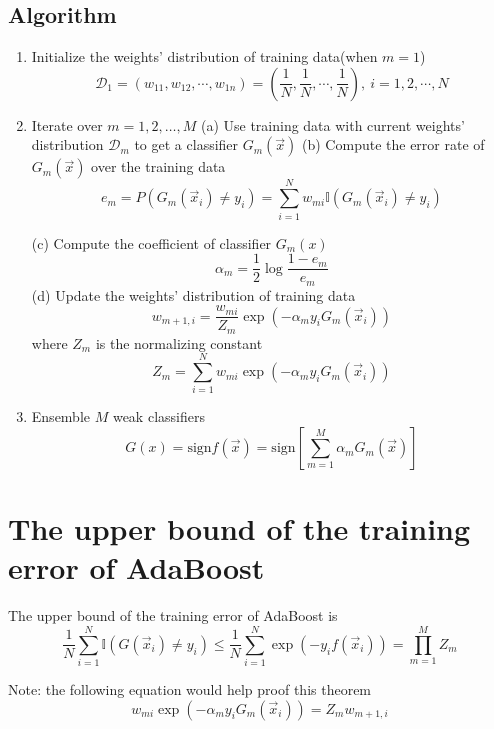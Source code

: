 \subsection{Algorithm}

\begin{enumerate}
\item Initialize the weights' distribution of training data(when $m=1$)
\begin{equation}\nonumber
\mathcal{D}_1=(w_{11},w_{12},\cdots,w_{1n})=(\frac{1}{N},\frac{1}{N},\cdots,\frac{1}{N}),\ i=1,2,\cdots,N
\end{equation}
\item Iterate over $m=1,2,\dotsc,M$
\subitem (a) Use training data with current weights' distribution $\mathcal{D}_m$ to get a classifier $G_m(\vec{x})$
\subitem (b) Compute the error rate of $G_m(\vec{x})$ over the training data \\
\begin{equation}
e_m=P(G_m(\vec{x}_i)\neq y_i)=\sum_{i=1}^N {w_{mi}\mathbb{I}(G_m(\vec{x}_i) \neq y_i)}
\end{equation}

\subitem (c) Compute the coefficient of classifier $G_m(x)$
\begin{equation}
\alpha_m = \frac{1}{2}\log{\frac{1-e_m}{e_m}}
\end{equation}
\subitem (d) Update the weights' distribution of training data
\begin{equation}
w_{m+1,i}=\frac{w_{mi}}{Z_m}\exp(-\alpha_m y_i G_m(\vec{x}_i))
\end{equation}
where $Z_m$ is the normalizing constant
\begin{equation}
Z_m=\sum_{i=1}^N w_{mi}\exp(-\alpha_m y_i G_m(\vec{x}_i))
\end{equation}

\item Ensemble $M$ weak classifiers
\begin{equation}
G(x)=\text{sign}f(\vec{x})=\text{sign}\left[\sum_{m=1}^M \alpha_m G_m(\vec{x})\right]
\end{equation}
\end{enumerate} 

\section{The upper bound of the training error of AdaBoost}
\begin{theorem}
The upper bound of the training error of AdaBoost is 
\begin{equation}
\frac{1}{N} \sum_{i=1}^N \mathbb{I}(G(\vec{x}_i)\neq y_i) \leq \frac{1}{N} \sum_{i=1}^N \exp(-y_i f(\vec{x}_i))=\prod_{m=1}^M Z_m
\end{equation}

Note: the following equation would help proof this theorem
\begin{equation}
w_{mi}\exp(-\alpha_m y_i G_m(\vec{x}_i))=Z_m w_{m+1,i}
\end{equation}
\end{theorem}
